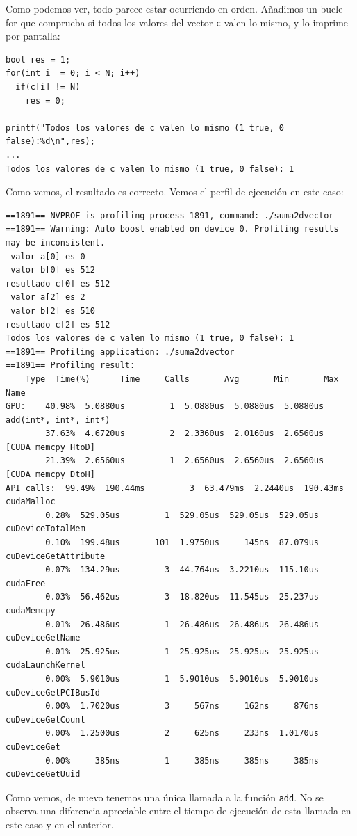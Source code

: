 \documentclass[11pt]{article}
\def\inline{\lstinline[basicstyle=\ttfamily,keywordstyle={}]}
\begin{document}
Como podemos ver, todo parece estar ocurriendo en orden. Añadimos un bucle for que comprueba si todos los valores del vector \inline{c} valen lo mismo, y lo imprime por pantalla:
\begin{verbatim}
bool res = 1;
for(int i  = 0; i < N; i++)
  if(c[i] != N)
	res = 0;

printf("Todos los valores de c valen lo mismo (1 true, 0 false):%d\n",res);
... 
Todos los valores de c valen lo mismo (1 true, 0 false): 1
\end{verbatim}
Como vemos, el resultado es correcto. Vemos el perfil de ejecución en este caso:
\begin{verbatim}
==1891== NVPROF is profiling process 1891, command: ./suma2dvector
==1891== Warning: Auto boost enabled on device 0. Profiling results may be inconsistent.
 valor a[0] es 0
 valor b[0] es 512
resultado c[0] es 512
 valor a[2] es 2
 valor b[2] es 510
resultado c[2] es 512
Todos los valores de c valen lo mismo (1 true, 0 false): 1
==1891== Profiling application: ./suma2dvector
==1891== Profiling result:
	Type  Time(%)      Time     Calls       Avg       Min       Max  Name
GPU:    40.98%  5.0880us         1  5.0880us  5.0880us  5.0880us  add(int*, int*, int*)
        37.63%  4.6720us         2  2.3360us  2.0160us  2.6560us  [CUDA memcpy HtoD]
        21.39%  2.6560us         1  2.6560us  2.6560us  2.6560us  [CUDA memcpy DtoH]
API calls:  99.49%  190.44ms         3  63.479ms  2.2440us  190.43ms  cudaMalloc
		0.28%  529.05us         1  529.05us  529.05us  529.05us  cuDeviceTotalMem
		0.10%  199.48us       101  1.9750us     145ns  87.079us  cuDeviceGetAttribute
		0.07%  134.29us         3  44.764us  3.2210us  115.10us  cudaFree
		0.03%  56.462us         3  18.820us  11.545us  25.237us  cudaMemcpy
		0.01%  26.486us         1  26.486us  26.486us  26.486us  cuDeviceGetName
		0.01%  25.925us         1  25.925us  25.925us  25.925us  cudaLaunchKernel
		0.00%  5.9010us         1  5.9010us  5.9010us  5.9010us  cuDeviceGetPCIBusId
		0.00%  1.7020us         3     567ns     162ns     876ns  cuDeviceGetCount
		0.00%  1.2500us         2     625ns     233ns  1.0170us  cuDeviceGet
		0.00%     385ns         1     385ns     385ns     385ns  cuDeviceGetUuid
\end{verbatim}

Como vemos, de nuevo tenemos una única llamada a la función \inline{add}. No se observa una diferencia apreciable entre el tiempo de ejecución de esta llamada en este caso y en el anterior.
\end{document}
